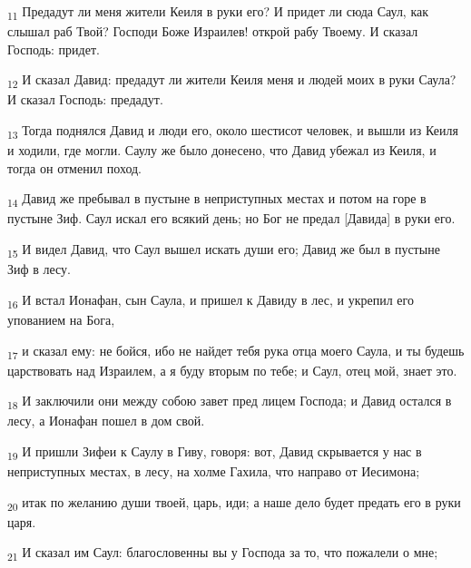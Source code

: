 \begin{tcolorbox}
\textsubscript{11} Предадут ли меня жители Кеиля в руки его? И придет ли сюда Саул, как слышал раб Твой? Господи Боже Израилев! открой рабу Твоему. И сказал Господь: придет.
\end{tcolorbox}
\begin{tcolorbox}
\textsubscript{12} И сказал Давид: предадут ли жители Кеиля меня и людей моих в руки Саула? И сказал Господь: предадут.
\end{tcolorbox}
\begin{tcolorbox}
\textsubscript{13} Тогда поднялся Давид и люди его, около шестисот человек, и вышли из Кеиля и ходили, где могли. Саулу же было донесено, что Давид убежал из Кеиля, и тогда он отменил поход.
\end{tcolorbox}
\begin{tcolorbox}
\textsubscript{14} Давид же пребывал в пустыне в неприступных местах и потом на горе в пустыне Зиф. Саул искал его всякий день; но Бог не предал [Давида] в руки его.
\end{tcolorbox}
\begin{tcolorbox}
\textsubscript{15} И видел Давид, что Саул вышел искать души его; Давид же был в пустыне Зиф в лесу.
\end{tcolorbox}
\begin{tcolorbox}
\textsubscript{16} И встал Ионафан, сын Саула, и пришел к Давиду в лес, и укрепил его упованием на Бога,
\end{tcolorbox}
\begin{tcolorbox}
\textsubscript{17} и сказал ему: не бойся, ибо не найдет тебя рука отца моего Саула, и ты будешь царствовать над Израилем, а я буду вторым по тебе; и Саул, отец мой, знает это.
\end{tcolorbox}
\begin{tcolorbox}
\textsubscript{18} И заключили они между собою завет пред лицем Господа; и Давид остался в лесу, а Ионафан пошел в дом свой.
\end{tcolorbox}
\begin{tcolorbox}
\textsubscript{19} И пришли Зифеи к Саулу в Гиву, говоря: вот, Давид скрывается у нас в неприступных местах, в лесу, на холме Гахила, что направо от Иесимона;
\end{tcolorbox}
\begin{tcolorbox}
\textsubscript{20} итак по желанию души твоей, царь, иди; а наше дело будет предать его в руки царя.
\end{tcolorbox}
\begin{tcolorbox}
\textsubscript{21} И сказал им Саул: благословенны вы у Господа за то, что пожалели о мне;
\end{tcolorbox}
